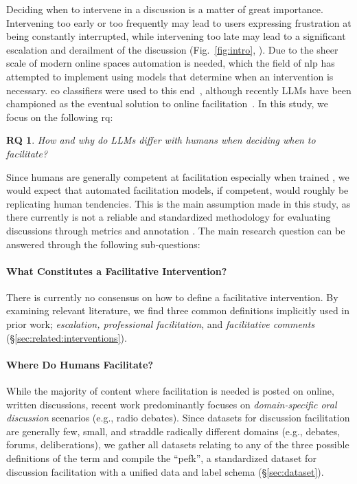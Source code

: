 \documentclass[11pt]{article}
\theoremstyle{definition}
\theoremstyle{plain}
\newtheorem*{researchquestion}{RQ}
\begin{document}
Deciding when to intervene in a discussion is a matter of great importance. Intervening too early or too frequently may lead to users expressing frustration at being constantly interrupted, while intervening too late may lead to a significant escalation and derailment of the discussion (Fig.~\ref{fig:intro}, \citet{korre-etal-2025-evaluation, gao-etal-2025-moderation}). Due to the sheer scale of modern online spaces automation is needed, which the field of \ac{nlp} has attempted to implement using models that determine when an intervention is necessary. \ac{eo} classifiers were used to this end~\citep{falk-etal-2021-predicting}, although recently LLMs have been championed as the eventual solution to online facilitation~\citep{korre-etal-2025-evaluation, small-polis-llm}. In this study, we focus on the following \ac{rq}:

\begin{researchquestion}
	\label{rq:aberrant-llms}
	How and why do LLMs differ with humans when deciding when to facilitate?
\end{researchquestion}

Since humans are generally competent at facilitation \citep{umod} especially when trained \citep{schroeder-etal-2024-fora, park2016supporting}, we would expect that automated facilitation models, if competent, would roughly be replicating human tendencies. This is the main assumption made in this study, as there currently is not a reliable and standardized methodology for evaluating discussions through metrics and annotation \citep{korre-etal-2025-evaluation}. The main research question can be answered through the following sub-questions:

\paragraph{What Constitutes a Facilitative Intervention?} There is currently no consensus on how to define a facilitative intervention. By examining relevant literature, we find three common definitions implicitly used in prior work; \emph{escalation, professional facilitation}, and \emph{facilitative comments} (\S\ref{sec:related:interventions}). 

\paragraph{Where Do Humans Facilitate?} While the majority of content where facilitation is needed is posted on online, written discussions, recent work predominantly focuses on \emph{domain-specific oral discussion} scenarios (e.g., radio debates).	Since datasets for discussion facilitation are generally few, small, and straddle radically different domains (e.g., debates, forums, deliberations), we gather all datasets relating to any of the three possible definitions of the term and compile the ``\ac{pefk}'', a standardized dataset for discussion facilitation with a unified data and label schema (\S\ref{sec:dataset}). %
\end{document}
